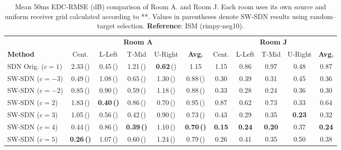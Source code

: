 \documentclass[journal]{IEEEtran}
\begin{document}
\begin{table}[tbh]
    \centering
    \caption{Mean 50ms EDC-RMSE (dB) comparison of Room A. and Room J. Each room uses its own source and uniform receiver grid calculated according to **.  Values in parentheses denote SW-SDN results using random–target selection. \textbf{Reference}: ISM (rimpy-neg10).}
    \label{tab:merged-results-waspaa}
    \renewcommand{\arraystretch}{1.15}
    \scriptsize
    \setlength{\tabcolsep}{2.5pt}
    
    \begin{tabular}{l ccccc | ccccc}
        \toprule
        & \multicolumn{5}{c|}{\textbf{Room A}} & \multicolumn{5}{c}{\textbf{Room J}} \\
        \cmidrule(lr){2-6} \cmidrule(l){7-11}
        \textbf{Method} & Cent. & L-Left & T-Mid & U-Right & \textbf{Avg.} & Cent. & L-Left & T-Mid & U-Right & \textbf{Avg.} \\
        \midrule
        
        SDN Orig. ($c=1$)
            & 2.33\,() & 0.45\,() & 1.21\,() & \textbf{0.62}\,() & 1.15 
            & 1.15 & 0.86 & 0.97 & 0.48 & 0.87 \\
        \midrule
        
        SW-SDN ($c=-3$)
            & 0.49\,() & 1.08\,() & 0.65\,() & 1.30\,() & 0.88\,() 
            & 0.30 & 0.39 & 0.31 & 0.45 & 0.36 \\
            
        SW-SDN ($c=-2$)
            & 0.85\,() & 0.90\,() & 0.59\,() & 1.18\,() & 0.88\,() 
            & 0.33 & 0.28 & 0.24 & 0.36 & 0.30 \\
            
        SW-SDN ($c=2$)
            & 1.83\,() & \textbf{0.40\,()} & 0.86\,() & 0.70\,() & 0.95\,() 
            & 0.87 & 0.62 & 0.73 & 0.33 & 0.64 \\
            
        SW-SDN ($c=3$)
            & 1.05\,() & 0.56\,() & 0.42\,() & 0.90\,() & 0.73\,() 
            & 0.43 & 0.29 & 0.35 & \textbf{0.23} & 0.32 \\
            
        SW-SDN ($c=4$)
            & 0.44\,() & 0.86\,() & \textbf{0.39\,()} & 1.10\,() & \textbf{0.70\,()} 
            & \textbf{0.15} & \textbf{0.24} & \textbf{0.20} & 0.37 & \textbf{0.24} \\
            
        SW-SDN ($c=5$)
            & \textbf{0.26\,()} & 1.07\,() & 0.60\,() & 1.24\,() & 0.79\,() 
            & 0.26 & 0.41 & 0.35 & 0.50 & 0.38 \\
            

\end{tabular}
\end{table}
\end{document}
